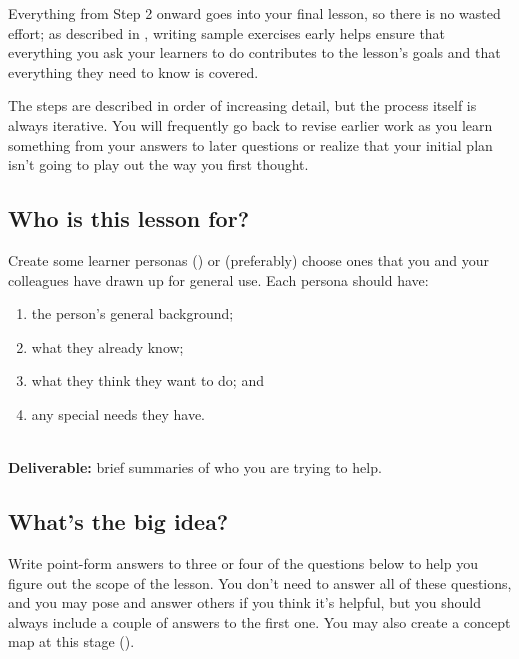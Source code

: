 Everything from Step 2 onward goes into your final lesson,
so there is no wasted effort;
as described in ,
writing sample exercises early helps ensure that
everything you ask your learners to do contributes to the lesson's goals
and that everything they need to know is covered.

The steps are described in order of increasing detail,
but the process itself is always iterative.
You will frequently go back to revise earlier work
as you learn something from your answers to later questions
or realize that your initial plan isn't going to play out the way you first thought.

\subsection*{Who is this lesson for?}

Create some learner personas ()
or (preferably) choose ones that you and your colleagues have drawn up for general use.
Each persona should have:

\begin{enumerate}

\item
  the person's general background;

\item
  what they already know;

\item
  what they think they want to do; and

\item
  any special needs they have.

\end{enumerate}

~\\
\noindent
\textbf{Deliverable:} brief summaries of who you are trying to help.

\subsection*{What's the big idea?}

Write point-form answers to three or four of the questions below
to help you figure out the scope of the lesson.
You don't need to answer all of these questions,
and you may pose and answer others if you think it's helpful,
but you should always include a couple of answers to the first one.
You may also create a concept map at this stage ().

